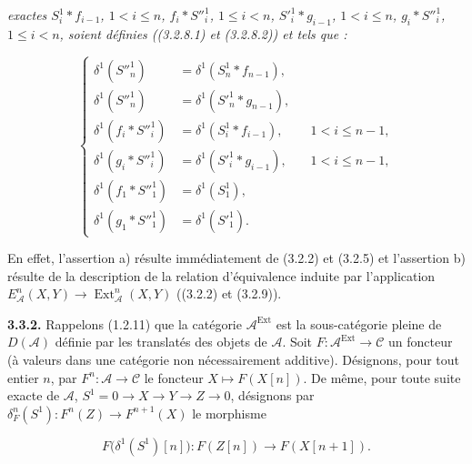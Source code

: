 \clearpage
{}%
\begingroup\small\setlength{\parskip}{0pt}\setlength{\emergencystretch}{1.5em}
\setlength{\abovedisplayskip}{4pt plus 2pt minus 2pt}%
\setlength{\belowdisplayskip}{4pt plus 2pt minus 2pt}%

\noindent\textit{exactes $S_i^1*f_{i-1}$, $1<i\leq n$,
$f_i*{S''}_i^1$, $1\leq i<n$, ${S'}_i^1*g_{i-1}$, $1<i\leq n$,
$g_i*{S''}_i^1$, $1\leq i<n$, soient définies ((3.2.8.1) et (3.2.8.2))
et tels que :}

\begin{equation}
\left\{
\begin{aligned}
\delta^1({S''}_n^1)
  &=\delta^1(S_n^1*f_{n-1}),\\
\delta^1({S''}_n^1)
  &=\delta^1({S'}_n^1*g_{n-1}),\\
\delta^1(f_i*{S''}_i^1)
  &=\delta^1(S_i^1*f_{i-1}),&&1<i\leq n-1,\\
\delta^1(g_i*{S''}_i^1)
  &=\delta^1({S'}_i^1*g_{i-1}),&&1<i\leq n-1,\\
\delta^1(f_1*{S''}_1^1)
  &=\delta^1(S_1^1),\\
\delta^1(g_1*{S''}_1^1)
  &=\delta^1({S'}_1^1).
\end{aligned}
\right.
\tag{3.3.1.2}
\end{equation}

En effet, l'assertion a) résulte immédiatement de (3.2.2) et (3.2.5) et
l'assertion b) résulte de la description de la relation d'équivalence induite
par l'application
$E_{\mathcal A}^{n}(X,Y)\longrightarrow
\operatorname{Ext}_{\mathcal A}^{n}(X,Y)$ ((3.2.2) et (3.2.9)).

\medskip\noindent\textbf{3.3.2.}\quad
Rappelons (1.2.11) que la catégorie $\mathcal A^{\operatorname{Ext}}$ est la
sous-catégorie pleine de $D(\mathcal A)$ définie par les translatés des
objets de $\mathcal A$. Soit
$F\colon\mathcal A^{\operatorname{Ext}}\longrightarrow\mathcal C$ un
foncteur (à valeurs dans une catégorie non nécessairement additive).
Désignons, pour tout entier $n$, par
$F^n\colon\mathcal A\longrightarrow\mathcal C$ le foncteur
$X\longmapsto F(X[n])$. De même, pour toute suite exacte de $\mathcal A$,
$S^1=0\longrightarrow X\longrightarrow Y\longrightarrow Z
\longrightarrow0$, désignons par
$\delta_F^n(S^1)\colon F^n(Z)\longrightarrow F^{n+1}(X)$ le morphisme

\[
F\bigl(\delta^1(S^1)[n]\bigr)
\colon F(Z[n])\longrightarrow F(X[n+1]).
\]


